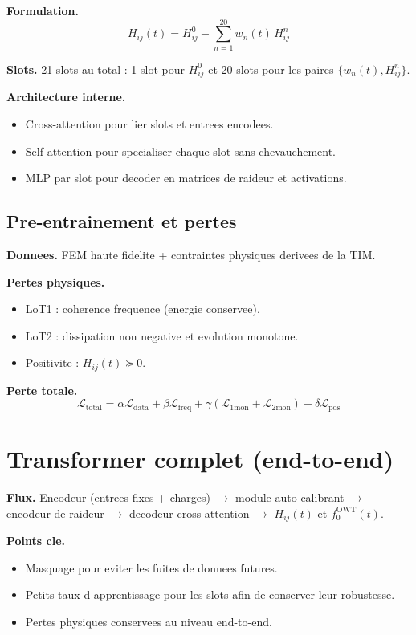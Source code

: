 \documentclass[11pt]{article}
\begin{document}
\textbf{Formulation.}
\begin{equation}
H_{ij}(t) = H_{ij}^0 - \sum_{n=1}^{20} w_n(t)\,H_{ij}^n
\end{equation}

\textbf{Slots.} 21 slots au total : 1 slot pour $H_{ij}^0$ et 20 slots pour les paires
$\{w_n(t), H_{ij}^n\}$.

\textbf{Architecture interne.}
\begin{itemize}
  \item Cross-attention pour lier slots et entrees encodees.
  \item Self-attention pour specialiser chaque slot sans chevauchement.
  \item MLP par slot pour decoder en matrices de raideur et activations.
\end{itemize}

\subsection{Pre-entrainement et pertes}
\textbf{Donnees.} FEM haute fidelite + contraintes physiques derivees de la TIM.

\textbf{Pertes physiques.}
\begin{itemize}
  \item LoT1 : coherence frequence (energie conservee).
  \item LoT2 : dissipation non negative et evolution monotone.
  \item Positivite : $H_{ij}(t) \succeq 0$.
\end{itemize}

\textbf{Perte totale.}
\begin{equation}
\mathcal{L}_{\mathrm{total}} = \alpha\mathcal{L}_{\mathrm{data}} + \beta\mathcal{L}_{\mathrm{freq}} +
\gamma(\mathcal{L}_{1\mathrm{mon}} + \mathcal{L}_{2\mathrm{mon}}) + \delta\mathcal{L}_{\mathrm{pos}}
\end{equation}

\section{Transformer complet (end-to-end)}
\textbf{Flux.} Encodeur (entrees fixes + charges) $\rightarrow$ module auto-calibrant
$\rightarrow$ encodeur de raideur $\rightarrow$ decodeur cross-attention $\rightarrow$
$H_{ij}(t)$ et $f_0^{\mathrm{OWT}}(t)$.

\textbf{Points cle.}
\begin{itemize}
  \item Masquage pour eviter les fuites de donnees futures.
  \item Petits taux d apprentissage pour les slots afin de conserver leur robustesse.
  \item Pertes physiques conservees au niveau end-to-end.
\end{itemize}
\end{document}
